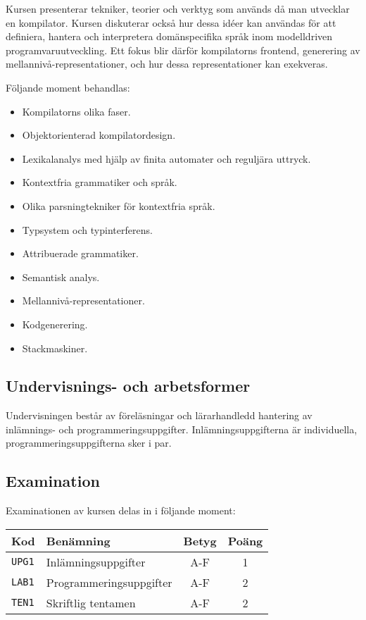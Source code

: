 Kursen presenterar tekniker, teorier och verktyg som används då man
utvecklar en kompilator. Kursen diskuterar också hur dessa idéer kan
användas för att definiera, hantera och interpretera domänspecifika
språk inom modelldriven programvaruutveckling. Ett fokus blir därför
kompilatorns frontend, generering av mellannivå-representationer, och
hur dessa representationer kan exekveras.

Följande moment behandlas:

\begin{itemize}
\tightlist
\item
  Kompilatorns olika faser.
\item
  Objekt­orienterad kompilatordesign.
\item
  Lexikalanalys med hjälp av finita automater och reguljära uttryck.
\item
  Kontextfria grammatiker och språk.
\item
  Olika parsningtekniker för kontextfria språk.
\item
  Typsystem och typinterferens.
\item
  Attribuerade grammatiker.
\item
  Semantisk analys.
\item
  Mellannivå-representationer.
\item
  Kodgenerering.
\item
  Stackmaskiner.
\end{itemize}

\subsection*{Undervisnings- och
arbetsformer}

Undervisningen består av föreläsningar och lärarhandledd hantering av
inlämnings- och programmeringsuppgifter. Inlämningsuppgifterna är
individuella, programmeringsuppgifterna sker i par.

\subsection*{Examination}

Examinationen av kursen delas in i följande moment:

\begin{longtable}[]{@{}llcc@{}}
\toprule
\textsf{Kod} & \textsf{Benämning} & \textsf{Betyg} & \textsf{Poäng}\tabularnewline
\midrule
\endhead
\texttt{UPG1} & Inlämningsuppgifter & A-F & 1\tabularnewline
\texttt{LAB1} & Programmeringsuppgifter & A-F & 2\tabularnewline
\texttt{TEN1} & Skriftlig tentamen & A-F & 2\tabularnewline
\bottomrule
\end{longtable}

